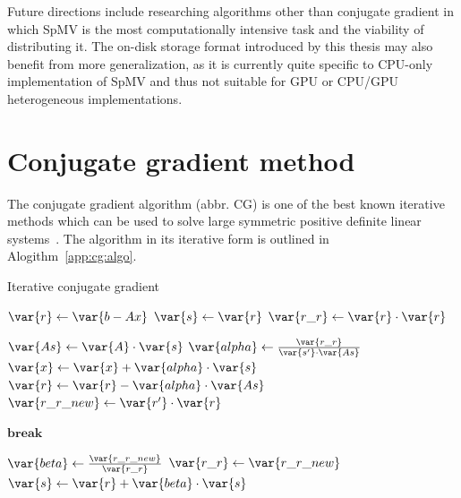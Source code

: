 \documentclass[thesis=M,english]{FITthesis}[2019/12/23]
\begin{document}
Future directions include researching algorithms other than conjugate gradient in which SpMV is the
most computationally intensive task and the viability of distributing it. The on-disk storage format
introduced by this thesis may also benefit from more generalization, as it is currently quite specific to
CPU-only implementation of SpMV and thus not suitable for GPU or CPU/GPU heterogeneous implementations.





\appendix


\chapter{Conjugate gradient method}\label{app:cg}

The conjugate gradient algorithm (abbr. CG) is one of the best known iterative methods which can be used to solve large
symmetric positive definite linear systems~\cite{saad03:IMS}. The algorithm in its iterative form is outlined
in Alogithm~\ref{app:cg:algo}.

\begin{algorithm}
    \caption{Iterative conjugate gradient}\label{app:cg:algo}
    \begin{algorithmic}
        \State $\var{r} \gets \var{b - Ax}$
        \State $\var{s} \gets \var{r}$
        \State $\var{r\_r} \gets \var{r} \cdot \var{r}$

        \State $\var{As} \gets \var{A} \cdot \var{s}$
        \State $\var{alpha} \gets \frac{\var{r\_r}}{\var{s'} \cdot \var{As}} $
        \State $\var{x} \gets \var{x} + \var{alpha} \cdot \var{s}$
        \State $\var{r} \gets \var{r} - \var{alpha} \cdot \var{As}$
        \State $\var{r\_r\_new} \gets \var{r'} \cdot \var{r}$

        \State $\textbf{break}$
        \EndIf

        \State $\var{beta} \gets \frac{\var{r\_r\_new}}{\var{r\_r}}$
        \State $\var{r\_r} \gets \var{r\_r\_new}$
        \State $\var{s} \gets \var{r} + \var{beta} \cdot \var{s}$

        \EndFor

        \EndFunction
    \end{algorithmic}
\end{algorithm}
\end{document}
